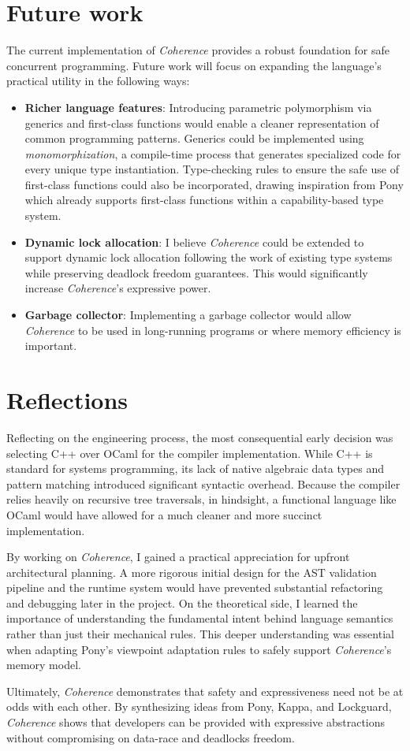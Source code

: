 \section{Future work}
The current implementation of \textit{Coherence} provides a robust foundation for safe concurrent programming. Future work will focus on expanding the language's practical utility in the following ways:
\begin{itemize}
  \item \textbf{Richer language features}: 
  Introducing parametric polymorphism via generics and first-class functions would enable a cleaner representation of common programming patterns. Generics could be implemented using \textit{monomorphization}, a compile-time process that generates specialized code for every unique type instantiation. Type-checking rules to ensure the safe use of first-class functions could also be incorporated, drawing inspiration from Pony which already supports first-class functions within a capability-based type system.
  \item \textbf{Dynamic lock allocation}: I believe \textit{Coherence} could be extended to support dynamic lock allocation following the work of existing type systems\cite{dynamic_locks} while preserving deadlock freedom guarantees. This would significantly increase \textit{Coherence}'s expressive power. 
  \item \textbf{Garbage collector}: Implementing a garbage collector would allow \textit{Coherence} to be used in long-running programs or where memory efficiency is important.
\end{itemize}

\section{Reflections} \label{sec:reflections}
Reflecting on the engineering process, the most consequential early decision was selecting C++ over OCaml for the compiler implementation. While C++ is standard for systems programming, its lack of native algebraic data types and pattern matching introduced significant syntactic overhead. Because the compiler relies heavily on recursive tree traversals, in hindsight, a functional language like OCaml would have allowed for a much cleaner and more succinct implementation.

By working on \textit{Coherence}, I gained a practical appreciation for upfront architectural planning. A more rigorous initial design for the AST validation pipeline and the runtime system would have prevented substantial refactoring and debugging later in the project. On the theoretical side, I learned the importance of understanding the fundamental intent behind language semantics rather than just their mechanical rules. This deeper understanding was essential when adapting Pony's viewpoint adaptation rules to safely support \textit{Coherence}'s memory model.

Ultimately, \textit{Coherence} demonstrates that safety and expressiveness need not be at odds with each other. By synthesizing ideas from Pony, Kappa, and Lockguard, \textit{Coherence} shows that developers can be provided with expressive abstractions without compromising on data-race and deadlocks freedom.